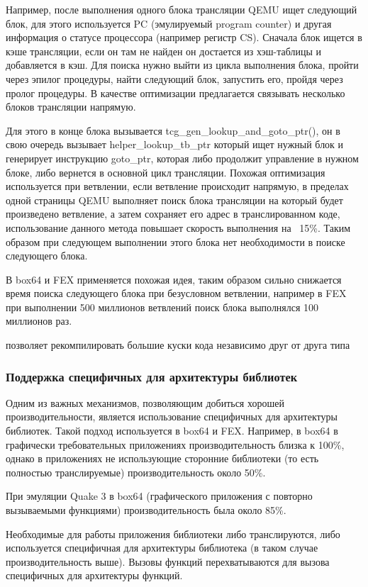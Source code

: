 Например, после выполнения одного блока трансляции QEMU ищет следующий блок, для этого используется PC (эмулируемый program counter) и другая информация о статусе процессора (например регистр CS). Сначала блок ищется в кэше трансляции, если он там не найден он достается из хэш-таблицы и добавляется в кэш. Для поиска нужно выйти из цикла выполнения блока, пройти через эпилог процедуры, найти следующий блок, запустить его, пройдя через пролог процедуры. В качестве оптимизации предлагается связывать несколько блоков трансляции напрямую.

Для этого в конце блока вызывается tcg\_gen\_lookup\_and\_goto\_ptr(), он в свою очередь вызывает helper\_lookup\_tb\_ptr который ищет нужный блок и генерирует инструкцию goto\_ptr, которая либо продолжит управление в нужном блоке, либо вернется в основной цикл трансляции. Похожая оптимизация используется при ветвлении, если ветвление происходит напрямую, в пределах одной страницы QEMU выполняет поиск блока трансляции на который будет произведено ветвление, а затем сохраняет его адрес в транслированном коде, использование данного метода повышает скорость выполнения на ~15\%. Таким образом при следующем выполнении этого блока нет необходимости в поиске следующего блока. \cite{qemu_docs}

В box64 и FEX применяется похожая идея, таким образом сильно снижается время поиска следующего блока при безусловном ветвлении, например в FEX при выполнении 500 миллионов ветвлений поиск блока выполнялся 100 миллионов раз. \cite{fex_video}

позволяет рекомпилировать большие куски кода независимо друг от друга типа

\subsubsection{Поддержка специфичных для архитектуры библиотек}

Одним из важных механизмов, позволяющим добиться хорошей производительности, является использование специфичных для архитектуры библиотек. Такой подход используется в box64 и FEX. Например, в box64 в графически требовательных приложениях производительность близка к 100\%, однако в приложениях не использующие сторонние библиотеки (то есть полностью транслируемые) производительность около 50\%.

При эмуляции Quake 3 в box64 (графического приложения с повторно вызываемыми функциями) производительность была около 85\%.

Необходимые для работы приложения библиотеки либо транслируются, либо используется специфичная для архитектуры библиотека (в таком случае производительность выше). Вызовы функций перехватываются для вызова специфичных для архитектуры функций. 

